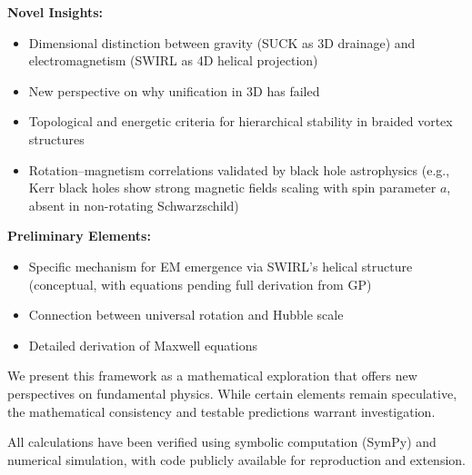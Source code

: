 \textbf{Novel Insights:}
\begin{itemize}
\item Dimensional distinction between gravity (SUCK as 3D drainage) and electromagnetism (SWIRL as 4D helical projection)
\item New perspective on why unification in 3D has failed
\item Topological and energetic criteria for hierarchical stability in braided vortex structures
\item Rotation–magnetism correlations validated by black hole astrophysics (e.g., Kerr black holes show strong magnetic fields scaling with spin parameter $a$, absent in non-rotating Schwarzschild)
\end{itemize}

\textbf{Preliminary Elements:}
\begin{itemize}
\item Specific mechanism for EM emergence via SWIRL's helical structure (conceptual, with equations pending full derivation from GP)
\item Connection between universal rotation and Hubble scale
\item Detailed derivation of Maxwell equations
\end{itemize}

We present this framework as a mathematical exploration that offers new perspectives on fundamental physics. While certain elements remain speculative, the mathematical consistency and testable predictions warrant investigation.

All calculations have been verified using symbolic computation (SymPy) and numerical simulation, with code publicly available for reproduction and extension.
